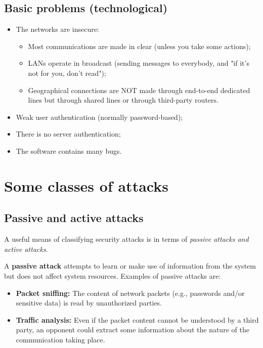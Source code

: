 \subsection{Basic problems (technological)}
\begin{itemize}
  \item The networks are insecure:
        \begin{itemize}
          \item Most communications are made in clear (unless you take some actions);
          \item LANs operate in broadcast (sending messages to everybody, and "if it's not for you, don't read");
          \item Geographical connections are NOT made through end-to-end dedicated lines but through shared lines or through third-party routers.
        \end{itemize}
  \item Weak user authentication (normally password-based);
  \item There is no server authentication;
  \item The software contains many bugs.
\end{itemize}


\section{Some classes of attacks}

\subsection{Passive and active attacks}
A useful means of classifying security attacks is in terms of \emph{passive attacks and active attacks}.

A \textbf{passive attack} attempts to {learn or make use of information from the system but does not affect system resources}. Examples of passive attacks are:

\begin{itemize}
  \item \textbf{Packet sniffing:} The content of network packets (e.g., passwords and/or sensitive data) is read by unauthorized parties.
  \item \textbf{Traffic analysis:} Even if the packet content cannot be understood by a third party, an opponent could extract some information about the nature of the communication taking place.
\end{itemize}

